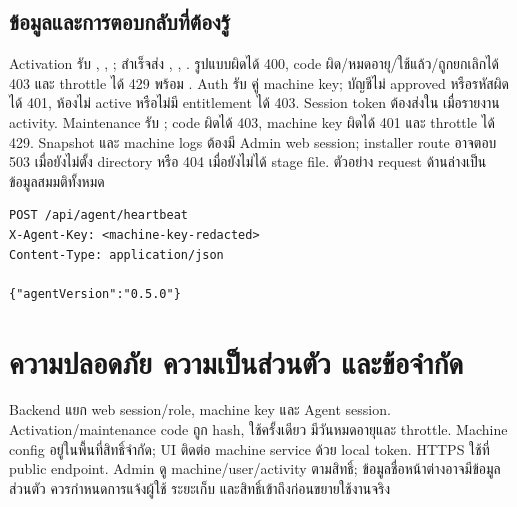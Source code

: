 \section*{ข้อมูลและการตอบกลับที่ต้องรู้}
Activation รับ , , ; สำเร็จส่ง , , . รูปแบบผิดได้ 400, code ผิด/หมดอายุ/ใช้แล้ว/ถูกยกเลิกได้ 403 และ throttle ได้ 429 พร้อม . Auth รับ  คู่ machine key; บัญชีไม่ approved หรือรหัสผิดได้ 401, ห้องไม่ active หรือไม่มี entitlement ได้ 403. Session token ต้องส่งใน  เมื่อรายงาน activity. Maintenance รับ ; code ผิดได้ 403, machine key ผิดได้ 401 และ throttle ได้ 429. Snapshot และ machine logs ต้องมี Admin web session; installer route อาจตอบ 503 เมื่อยังไม่ตั้ง directory หรือ 404 เมื่อยังไม่ได้ stage file. ตัวอย่าง request ด้านล่างเป็นข้อมูลสมมติทั้งหมด
\begin{lstlisting}
POST /api/agent/heartbeat
X-Agent-Key: <machine-key-redacted>
Content-Type: application/json

{"agentVersion":"0.5.0"}
\end{lstlisting}

\chapter{ความปลอดภัย ความเป็นส่วนตัว และข้อจำกัด}
Backend แยก web session/role, machine key และ Agent session. Activation/maintenance code ถูก hash, ใช้ครั้งเดียว มีวันหมดอายุและ throttle. Machine config อยู่ในพื้นที่สิทธิ์จำกัด; UI ติดต่อ machine service ด้วย local token. HTTPS ใช้ที่ public endpoint. Admin ดู machine/user/activity ตามสิทธิ์; ข้อมูลชื่อหน้าต่างอาจมีข้อมูลส่วนตัว ควรกำหนดการแจ้งผู้ใช้ ระยะเก็บ และสิทธิ์เข้าถึงก่อนขยายใช้งานจริง

